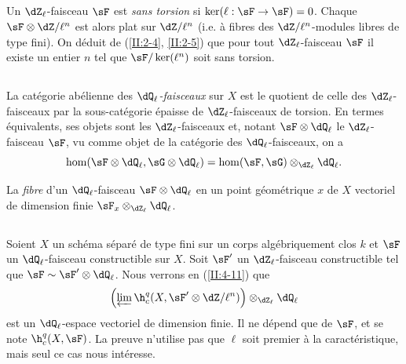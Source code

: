\subsection{}\label{II:2-8}

Un $\dZ_\ell$-faisceau $\sF$ est \emph{sans torsion} si 
$\ker(\ell:\sF\to\sF) = 0$. Chaque $\sF\otimes\dZ/\ell^n$ est alors plat sur 
$\dZ/\ell^n$ (i.e. à fibres des $\dZ/\ell^n$-modules libres de type fini). On 
déduit de (\ref{II:2-4}, \ref{II:2-5}) que pour tout $\dZ_\ell$-faisceau 
$\sF$ il existe un entier $n$ tel que $\sF/\ker(\ell^n)$ soit sans torsion. 





\subsection{}\label{II:2-9}

La catégorie abélienne des \emph{$\dQ_\ell$-faisceaux} sur $X$ est le 
quotient de celle des $\dZ_\ell$-faisceaux par la sous-catégorie épaisse de 
$\dZ_\ell$-faisceaux de torsion. En termes équivalents, ses objets sont les 
$\dZ_\ell$-faisceaux et, notant $\sF\otimes\dQ_\ell$ le $\dZ_\ell$-faisceau 
$\sF$, vu comme objet de la catégorie des $\dQ_\ell$-faisceaux, on a 
\[
  \hom(\sF\otimes\dQ_\ell,\sG\otimes\dQ_\ell) = \hom(\sF,\sG)\otimes_{\dZ_\ell}\dQ_\ell \text{.}
\]

La \emph{fibre} d'un $\dQ_\ell$-faisceau $\sF\otimes\dQ_\ell$ en un point 
géométrique $x$ de $X$  vectoriel de dimension 
finie $\sF_x\otimes_{\dZ_\ell}\dQ_\ell$. 





\subsection{}\label{II:2-10}

Soient $X$ un schéma séparé de type fini sur un corps algébriquement 
clos $k$ et $\sF$ un $\dQ_\ell$-faisceau constructible sur $X$. Soit $\sF'$ un 
$\dZ_\ell$-faisceau constructible tel que 
$\sF\sim \sF'\otimes\dQ_\ell$. Nous verrons en (\ref{II:4-11}) que 
\[
  \left(\varprojlim \h_c^q(X,\sF'\otimes \dZ/\ell^n)\right)\otimes_{\dZ_\ell}\dQ_\ell
\]
est un $\dQ_\ell$-espace vectoriel de dimension finie. Il ne dépend que de 
$\sF$, et se note $\h_c^q(X,\sF)$. La preuve n'utilise pas que $\ell$ soit 
premier à la caractéristique, mais seul ce cas nous intéresse. 






